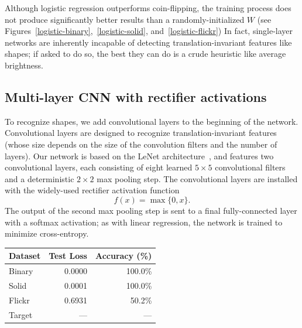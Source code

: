 \documentclass{article}
\newcommand{\dataset}[1]{\textsf{#1}}
\begin{document}
    Although logistic regression outperforms coin-flipping, the training process does not produce significantly better results than a randomly-initialized $W$ (see Figures~\ref{logistic-binary},~\ref{logistic-solid}, and~\ref{logistic-flickr}) In fact, single-layer networks are inherently incapable of detecting translation-invariant features like shapes; if asked to do so, the best they can do is a crude heuristic like average brightness.


  \subsection{Multi-layer CNN with rectifier activations}

    To recognize shapes, we add convolutional layers to the beginning of the network. Convolutional layers are designed to recognize translation-invariant features (whose size depends on the size of the convolution filters and the number of layers). Our network is based on the LeNet architecture~\cite{lenet}, and features two convolutional layers, each consisting of eight learned $5\times 5$ convolutional filters and a deterministic $2\times 2$ max pooling step. The convolutional layers are installed with the widely-used rectifier activation function
    \[ f(x) = \max \{0, x\}. \]
    The output of the second max pooling step is sent to a final fully-connected layer with a softmax activation; as with linear regression, the network is trained to minimize cross-entropy.

    \begin{table}[ht]
      \centering
      \begin{tabular}{lrr}\toprule
        \textbf{Dataset} & \textbf{Test Loss} & \textbf{Accuracy (\%)}\\\midrule
        \dataset{Binary} & 0.0000 & 100.0\% \\ %
        \dataset{Solid}  & 0.0001 & 100.0\% \\ %
        \dataset{Flickr} & 0.6931 &  50.2\% \\ %
        \dataset{Target} &    --- &     --- \\ \bottomrule
      \end{tabular}
    \end{table}
\end{document}
